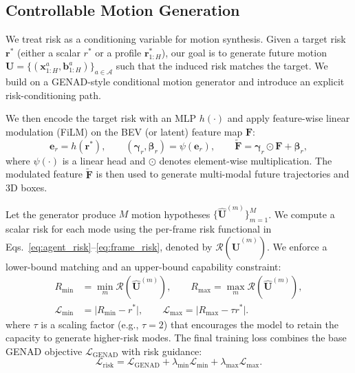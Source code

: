 \documentclass{article}
\begin{document}
\subsection{Controllable Motion Generation}
\label{subsec:risk_cond_motion}

We treat risk as a conditioning variable for motion synthesis. Given a target risk $\mathbf{r}^*$ (either a scalar $r^*$ or a profile $\mathbf{r}^*_{1:H}$), our goal is to generate future motion $\mathbf{U}=\{(\mathbf{x}_{1:H}^a,\mathbf{b}_{1:H}^a)\}_{a\in\mathcal{A}}$ such that the induced risk matches the target. We build on a GENAD-style conditional motion generator \cite{zheng2024genad} and introduce an explicit risk-conditioning path.

We then encode the target risk with an MLP $h(\cdot)$ and apply feature-wise linear modulation (FiLM) on the BEV (or latent) feature map
$\mathbf{F}$:
\begin{equation}
\label{eq:film_risk}
\mathbf{e}_r = h(\mathbf{r}^*),\qquad
(\boldsymbol{\gamma}_r,\boldsymbol{\beta}_r) = \psi(\mathbf{e}_r),\qquad
\tilde{\mathbf{F}} = \boldsymbol{\gamma}_r \odot \mathbf{F} + \boldsymbol{\beta}_r,
\end{equation}
where $\psi(\cdot)$ is a linear head and $\odot$ denotes element-wise multiplication.
The modulated feature $\tilde{\mathbf{F}}$ is then used to generate multi-modal future trajectories and 3D boxes.

Let the generator produce $M$ motion hypotheses $\{\hat{\mathbf{U}}^{(m)}\}_{m=1}^M$.
We compute a scalar risk for each mode using the per-frame risk functional in
Eqs.~\eqref{eq:agent_risk}--\eqref{eq:frame_risk}, denoted by $\mathcal{R}(\hat{\mathbf{U}}^{(m)})$.
We enforce a lower-bound matching and an upper-bound capability constraint:
\begin{equation}
\label{eq:risk_minmax}
\begin{aligned}
R_{\min} &= \min_{m} \mathcal{R}\!\left(\hat{\mathbf{U}}^{(m)}\right), \qquad
R_{\max} = \max_{m} \mathcal{R}\!\left(\hat{\mathbf{U}}^{(m)}\right), \\
\mathcal{L}_{\min} &= \big| R_{\min} - r^* \big|, \qquad
\mathcal{L}_{\max} = \big| R_{\max} - \tau r^* \big|.
\end{aligned}
\end{equation}
where $\tau$ is a scaling factor (e.g., $\tau=2$) that encourages the model to retain the capacity to generate higher-risk modes.
The final training loss combines the base GENAD objective $\mathcal{L}_{\mathrm{GENAD}}$ with risk guidance:
\begin{equation}
\label{eq:risk_total}
\mathcal{L}_{\mathrm{risk}}
= \mathcal{L}_{\mathrm{GENAD}}
+ \lambda_{\min}\mathcal{L}_{\min}
+ \lambda_{\max}\mathcal{L}_{\max}.
\end{equation}
\end{document}
